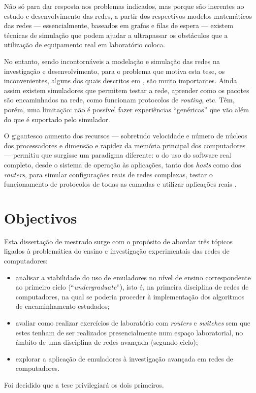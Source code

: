 Não só para dar resposta aos problemas indicados, mas porque são inerentes ao estudo e desenvolvimento das redes, a partir dos respectivos modelos matemáticos das redes --- essencialmente, baseados em grafos e filas de espera --- existem técnicas de simulação que podem ajudar a ultrapassar os obstáculos que a utilização de equipamento real em laboratório coloca.

No entanto, sendo incontornáveis a modelação e simulação das redes na investigação e desenvolvimento, para o problema que motiva esta tese, os inconvenientes, alguns dos quais descritos em \cite{difsiminternet}, são muito importantes. Ainda assim existem simuladores que permitem testar a rede, aprender como os pacotes são encaminhados na rede, como funcionam protocolos de \emph{routing}, etc. Têm, porém, uma limitação: não é possível fazer experiências ``genéricas'' que vão além do que é suportado pelo simulador.

O gigantesco aumento dos recursos --- sobretudo velocidade e número de núcleos dos processadores e dimensão e rapidez da memória principal dos computadores --- permitiu que surgisse um paradigma diferente: o do uso do software real completo, desde o sistema de operação às aplicações, tanto dos \emph{hosts} como dos \emph{routers}, para simular configurações reais de redes complexas, testar o funcionamento de protocolos de todas as camadas e utilizar aplicações reais \cite{reproduciblemininethifi}.

\section{Objectivos}
\label{sec:goals}

Esta dissertação de mestrado surge com o propósito de abordar três tópicos ligados à problemática do ensino e investigação experimentais das redes de computadores:
\begin{itemize}
	\item analisar a viabilidade do uso de emuladores no nível de ensino correspondente ao primeiro ciclo (``\emph{undergraduate}''), isto é, na primeira disciplina de redes de computadores, na qual se poderia proceder à implementação dos algoritmos de encaminhamento estudados;
	\item avaliar como realizar exercícios de laboratório com \emph{routers} e \emph{switches} sem que estes tenham de ser realizados presencialmente num espaço laboratorial, no âmbito de uma disciplina de redes avançada (segundo ciclo);
	\item explorar a aplicação de emuladores à investigação avançada em redes de computadores.
\end{itemize}
Foi decidido que a tese privilegiará os dois primeiros.

